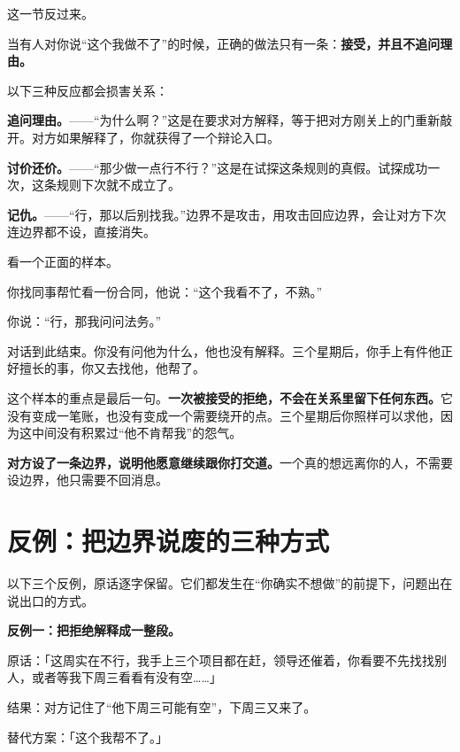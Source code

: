 这一节反过来。

当有人对你说“这个我做不了”的时候，正确的做法只有一条：\textbf{接受，并且不追问理由。}

以下三种反应都会损害关系：

\textbf{追问理由。}——“为什么啊？”这是在要求对方解释，等于把对方刚关上的门重新敲开。对方如果解释了，你就获得了一个辩论入口。

\textbf{讨价还价。}——“那少做一点行不行？”这是在试探这条规则的真假。试探成功一次，这条规则下次就不成立了。

\textbf{记仇。}——“行，那以后别找我。”边界不是攻击，用攻击回应边界，会让对方下次连边界都不设，直接消失。

看一个正面的样本。

\par
\begin{mdquote}
你找同事帮忙看一份合同，他说：“这个我看不了，不熟。”\par
你说：“行，那我问问法务。”\par
\vspace{0.3\baselineskip}
对话到此结束。你没有问他为什么，他也没有解释。三个星期后，你手上有件他正好擅长的事，你又去找他，他帮了。
\end{mdquote}

这个样本的重点是最后一句。\textbf{一次被接受的拒绝，不会在关系里留下任何东西。}它没有变成一笔账，也没有变成一个需要绕开的点。三个星期后你照样可以求他，因为这中间没有积累过“他不肯帮我”的怨气。

\textbf{对方设了一条边界，说明他愿意继续跟你打交道。}一个真的想远离你的人，不需要设边界，他只需要不回消息。

\section{反例：把边界说废的三种方式}

以下三个反例，原话逐字保留。它们都发生在“你确实不想做”的前提下，问题出在说出口的方式。

\begin{mdquote}
\textbf{反例一：把拒绝解释成一整段。}\par
\vspace{0.2\baselineskip}
原话：「这周实在不行，我手上三个项目都在赶，领导还催着，你看要不先找找别人，或者等我下周三看看有没有空……」\par
结果：对方记住了“他下周三可能有空”，下周三又来了。\par
替代方案：「这个我帮不了。」
\end{mdquote}

